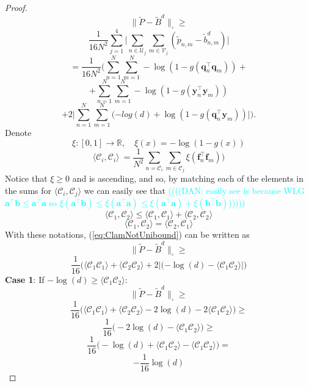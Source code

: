 \documentclass[letterpaper]{article} %
\begin{document}
\begin{proof}
\[\| \tilde{P}-\tilde{B}^d\|_{\square} \geq \]
\[\frac{1}{16N^2}\sum_{j=1}^4 \Big|\sum_{n\in \mathcal{U}_j}\sum_{m\in \mathcal{V}_j} (\tilde{p}_{n,m} - \tilde{b}^d_{n,m})\Big| \]
\[= \frac{1}{16N^2}\bigg(\sum_{n=1}^N\sum_{m=1}^{N} -\log(1-g(\mathbf{q}_n^\top \mathbf{q}_m))  +  \]
\begin{equation}
    +\sum_{n=1}^N\sum_{m=1}^{N} -\log(1-g(\mathbf{y}_n^\top \mathbf{y}_m))
\end{equation}
\begin{equation}
    \label{eq:ClamNotUnibound}
    +2\Big| \sum_{n=1}^N\sum_{m=1}^{N} ( -log(d) +\log(1-g(\mathbf{q}_n^\top \mathbf{y}_m))\Big|\bigg).
\end{equation}
Denote 
\[\xi:[0,1] \rightarrow \mathbb{R}, \quad \xi(x) = -\log(1-g(x))\]
\[\langle \mathcal{C}_i, \mathcal{C}_i\rangle\ = \frac{1}{N^2}\sum_{n=\mathcal{C}_i}\sum_{m\in \mathcal{C}_j} \xi(\mathbf{f}_n^\top \mathbf{f}_m))\]
Notice that $\xi \geq 0$ and is ascending, and so, by matching each of the elements in the sums for $\langle \mathcal{C}_i, \mathcal{C}_j\rangle$ we can easily see that \textcolor{cyan}{((((DAN: easily see is because WLG $\mathbf{a}^\top\mathbf{b} \leq \mathbf{a}^\top \mathbf{a}$ so $\xi(\mathbf{a}^\top\mathbf{b}) \leq \xi(\mathbf{a}^\top \mathbf{a}) \leq \xi(\mathbf{a}^\top \mathbf{a}) + \xi(\mathbf{b}^\top \mathbf{b})$)))))}
\begin{equation}
    \label{eq:meanIneq}
    \langle \mathcal{C}_1, \mathcal{C}_2 \rangle \leq \langle \mathcal{C}_1, \mathcal{C}_1 \rangle + \langle \mathcal{C}_2, \mathcal{C}_2 \rangle  
\end{equation}
\[\langle \mathcal{C}_1, \mathcal{C}_2 \rangle = \langle \mathcal{C}_2, \mathcal{C}_1 \rangle \]
With these notations, (\ref{eq:ClamNotUnibound}) can be written as
\[\| \tilde{P}-\tilde{B}^d\|_{\square} \geq \]
\[\frac{1}{16}\bigg(\langle \mathcal{C}_1 \mathcal{C}_1 \rangle  + \langle \mathcal{C}_2 \mathcal{C}_2 \rangle +2\Big|( -\log(d) -\langle \mathcal{C}_1 \mathcal{C}_2 \rangle\Big|\bigg)\]
\textbf{Case 1}: If $-\log(d) \geq \langle \mathcal{C}_1 \mathcal{C}_2 \rangle$:
\[\| \tilde{P}-\tilde{B}^d\|_{\square} \geq \]
\[\frac{1}{16}\bigg(\langle \mathcal{C}_1 \mathcal{C}_1 \rangle  + \langle \mathcal{C}_2 \mathcal{C}_2 \rangle -2\log(d) -2\langle \mathcal{C}_1 \mathcal{C}_2 \rangle\bigg) \geq\]
\[\frac{1}{16}\bigg(-2\log(d) -\langle \mathcal{C}_1 \mathcal{C}_2 \rangle\bigg) \geq\]
\[\frac{1}{16}\bigg(-\log(d) + \langle \mathcal{C}_1 \mathcal{C}_2 \rangle - \langle \mathcal{C}_1 \mathcal{C}_2 \rangle\bigg) =\]
\[-\frac{1}{16}\log(d)\]


\end{proof}
\end{document}
